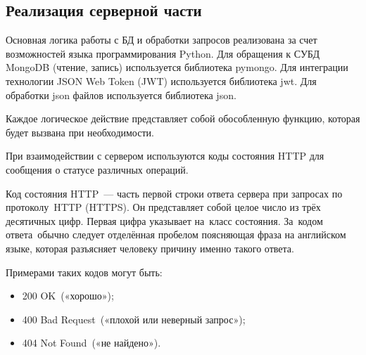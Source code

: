 \clearpage
\subsection{Реализация серверной части}
Основная логика работы с БД и обработки запросов реализована за счет возможностей языка программирования Python.
Для обращения к СУБД MongoDB (чтение, запись) используется библиотека pymongo. Для интеграции технологии JSON Web Token (JWT) используется библиотека jwt.
Для обработки json файлов используется библиотека json.

Каждое логическое действие представляет собой обособленную функцию, которая будет вызвана при необходимости.







При взаимодействии с сервером используются коды состояния HTTP для сообщения о статусе различных операций.
\begin{definition}
    Код состояния HTTP --- часть первой строки ответа сервера при запросах по протоколу HTTP (HTTPS).
    Он представляет собой целое число из трёх десятичных цифр. Первая цифра указывает на класс состояния.
    За кодом ответа обычно следует отделённая пробелом поясняющая фраза на английском языке, которая разъясняет человеку причину именно такого ответа.
\end{definition}

Примерами таких кодов могут быть:
\begin{itemize}
    \item 200 OK («хорошо»);
    \item 400 Bad Request («плохой или неверный запрос»);
    \item 404 Not Found («не найдено»).
\end{itemize}



